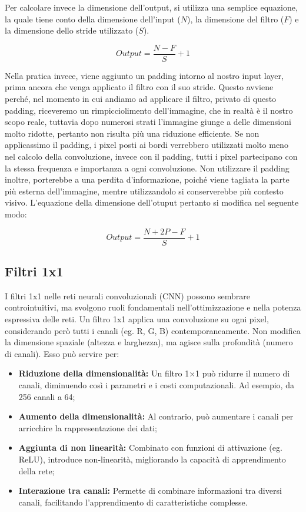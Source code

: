 Per calcolare invece la dimensione dell'output, si utilizza una semplice equazione, la quale tiene conto della dimensione dell'input ($N$), la dimensione del filtro ($F$) e la dimensione dello stride utilizzato ($S$).

\begin{equation}
    Output = \frac{N-F}{S} + 1
\end{equation}

Nella pratica invece, viene aggiunto un padding intorno al nostro input layer, prima ancora che venga applicato il filtro con il suo stride. Questo avviene perché, nel momento in cui andiamo ad applicare il filtro, privato di questo padding, riceveremo un rimpicciolimento dell'immagine, che in realtà è il nostro scopo reale, tuttavia dopo numerosi strati l'immagine giunge a delle dimensioni molto ridotte, pertanto non risulta più una riduzione efficiente. Se non applicassimo il padding, i pixel posti ai bordi verrebbero utilizzati molto meno nel calcolo della convoluzione, invece con il padding, tutti i pixel partecipano con la stessa frequenza e importanza a ogni convoluzione. Non utilizzare il padding inoltre, porterebbe a una perdita d'informazione, poiché viene tagliata la parte più esterna dell'immagine, mentre utilizzandolo si conserverebbe più contesto visivo. L'equazione della dimensione dell'otuput pertanto si modifica nel seguente modo:

\begin{equation}
    Output = \frac{N+2P-F}{S} +1
\end{equation}

\subsection{Filtri 1x1}

I filtri 1x1 nelle reti neurali convoluzionali (CNN) possono sembrare controintuitivi, ma svolgono ruoli fondamentali nell'ottimizzazione e nella potenza espressiva delle reti. Un filtro 1x1 applica una convoluzione su ogni pixel, considerando però tutti i canali (eg. R, G, B) contemporaneamente. Non modifica la dimensione spaziale (altezza e larghezza), ma agisce sulla profondità (numero di canali). Esso può servire per:

\begin{itemize}
    \item \textbf{Riduzione della dimensionalità:} Un filtro 1×1 può ridurre il numero di canali, diminuendo così i parametri e i costi computazionali. Ad esempio, da 256 canali a 64;
    \item \textbf{Aumento della dimensionalità:} Al contrario, può aumentare i canali per arricchire la rappresentazione dei dati;
    \item \textbf{Aggiunta di non linearità:} Combinato con funzioni di attivazione (eg. ReLU), introduce non-linearità, migliorando la capacità di apprendimento della rete;
    \item \textbf{Interazione tra canali:} Permette di combinare informazioni tra diversi canali, facilitando l'apprendimento di caratteristiche complesse.
\end{itemize}


